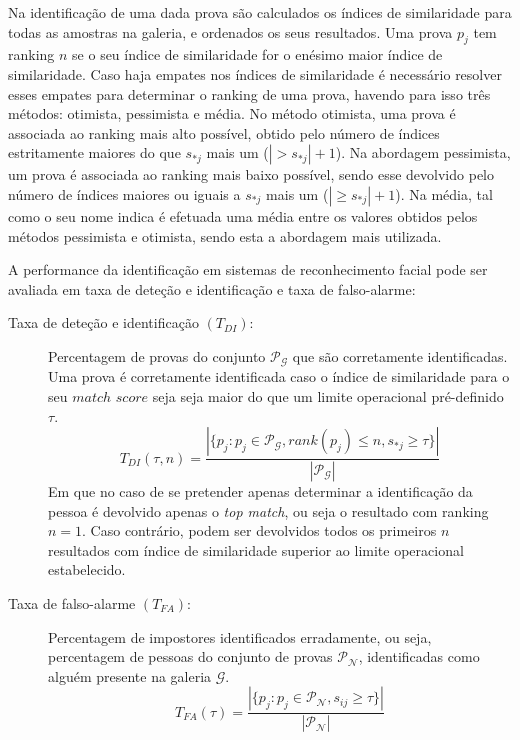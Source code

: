 Na identificação de uma dada prova são calculados os índices de similaridade para todas as amostras na galeria, e ordenados os seus resultados. Uma prova $p_j$ tem ranking $n$ se o seu índice de similaridade for o enésimo maior índice de similaridade. Caso haja empates nos índices de similaridade é necessário resolver esses empates para determinar o ranking de uma prova, havendo para isso três métodos: otimista, pessimista e média. No método otimista, uma prova é associada ao ranking mais alto possível, obtido pelo número de índices estritamente maiores do que $s_{*j}$ mais um ($|> s_{*j}| + 1$). Na abordagem pessimista, um prova é associada ao ranking mais baixo possível, sendo esse devolvido pelo número de índices maiores ou iguais a $s_{*j}$ mais um ($|\geqslant s_{*j}| + 1$). Na média, tal como o seu nome indica é efetuada uma média entre os valores obtidos pelos métodos pessimista e otimista, sendo esta a abordagem mais utilizada. 

A performance da identificação em sistemas de reconhecimento facial pode ser avaliada em taxa de deteção e identificação e taxa de falso-alarme:

 \begin{description}
 \item[Taxa de deteção e identificação $(T_{DI})$:] Percentagem de provas do conjunto $\mathscr{P}_\mathscr{G}$ que são corretamente  identificadas. Uma prova é corretamente identificada caso o índice de similaridade para o seu $match$ $score$ seja seja maior do que um limite operacional pré-definido $\tau$.
\begin{equation}
 T_{DI}(\tau, n) = \frac{|\{p_j:p_j \in \mathscr{P}_\mathscr{G}, rank(p_j) \leqslant n, s_{*j} \geqslant \tau\}|}{|\mathscr{P}_\mathscr{G}|}
\end{equation}
 Em que no caso de se pretender apenas determinar a identificação da pessoa é devolvido apenas o \textit{top match}, ou seja o resultado com ranking $n=1$. Caso contrário, podem ser devolvidos todos os primeiros $n$ resultados com índice de similaridade superior ao limite operacional estabelecido.
 
  \item[Taxa de falso-alarme $(T_{FA})$:] Percentagem de impostores identificados erradamente, ou seja, percentagem de pessoas do conjunto de provas $\mathscr{P}_\mathscr{N}$, identificadas como alguém presente na galeria $\mathscr{G}$.  
\begin{equation}
 T_{FA}(\tau) = \frac{|\{p_j:p_j \in \mathscr{P}_\mathscr{N}, s_{ij} \geqslant \tau\}|}{|\mathscr{P}_\mathscr{N}|}
\end{equation}
\end{description}

